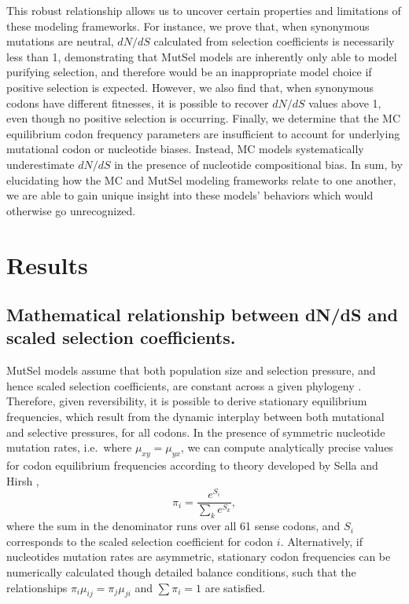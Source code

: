 \documentclass{pnastwo}
\begin{document}
\begin{article}
This robust relationship allows us to uncover certain properties and limitations of these modeling frameworks. For instance, we prove that, when synonymous mutations are neutral, $dN/dS$ calculated from selection coefficients is necessarily less than 1, demonstrating that MutSel models are inherently only able to model purifying selection, and therefore would be an inappropriate model choice if positive selection is expected. However, we also find that, when synonymous codons have different fitnesses, it is possible to recover $dN/dS$ values above 1, even though no positive selection is occurring. Finally, we determine that the MC equilibrium codon frequency parameters are insufficient to account for underlying mutational codon or nucleotide biases. Instead, MC models systematically underestimate $dN/dS$ in the presence of nucleotide compositional bias. In sum, by elucidating how the MC and MutSel modeling frameworks relate to one another, we are able to gain unique insight into these models’ behaviors which would otherwise go unrecognized.


\section*{Results}


\subsection*{Mathematical relationship between dN/dS and scaled selection coefficients.} 
MutSel models assume that both population size and selection pressure, and hence scaled selection coefficients, are constant across a given phylogeny \cite{HalpernBruno1998,YangNielsen2008,Thorne2012}. Therefore, given reversibility, it is possible to derive stationary equilibrium frequencies, which result from the dynamic interplay between both mutational and selective pressures, for all codons. In the presence of symmetric nucleotide mutation rates, i.e.\ where $\mu_{xy} = \mu_{yx}$, we can compute analytically precise values for codon equilibrium frequencies according to theory developed by Sella and Hirsh \cite{SellaHirsh2005}, 
\begin{equation}\label{eq:pi_i}
 \pi_i=\frac{e^{S_i}}{\sum_k e^{S_k}}, 
 \end{equation} 
 where the sum in the denominator runs over all 61 sense codons, and $S_i$ corresponds to the scaled selection coefficient for codon $i$. Alternatively, if nucleotides mutation rates are asymmetric, stationary codon frequencies can be numerically calculated though detailed balance conditions, such that the relationships $\pi_i\mu_{ij} = \pi_j\mu_{ji}$ and $\sum\pi_i = 1$ are satisfied.
 

\end{article}
\end{document}
